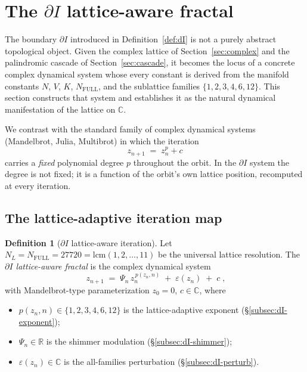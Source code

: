 \documentclass[11pt,a4paper]{article}
\theoremstyle{definition}
\newtheorem{definition}[theorem]{Definition}
\theoremstyle{remark}
\newcommand{\R}{\mathbb{R}}
\newcommand{\C}{\mathbb{C}}
\begin{document}
\section{The $\partial I$ lattice-aware fractal}\label{sec:fractal}

The boundary $\partial I$ introduced in Definition~\ref{def:dI} is not a purely abstract topological object. Given the complex lattice of Section~\ref{sec:complex} and the palindromic cascade of Section~\ref{sec:cascade}, it becomes the locus of a concrete complex dynamical system whose every constant is derived from the manifold constants $N$, $V$, $K$, $N_{\mathrm{FULL}}$, and the sublattice families $\{1,2,3,4,6,12\}$. This section constructs that system and establishes it as the natural dynamical manifestation of the lattice on $\C$.

We contrast with the standard family of complex dynamical systems (Mandelbrot, Julia, Multibrot) in which the iteration
\[
z_{n+1} \;=\; z_{n}^{p} + c
\]
carries a \emph{fixed} polynomial degree $p$ throughout the orbit. In the $\partial I$ system the degree is not fixed; it is a function of the orbit's own lattice position, recomputed at every iteration.

\subsection{The lattice-adaptive iteration map}

\begin{definition}[$\partial I$ lattice-aware iteration]\label{def:dI-iteration}
Let $N_{L}=N_{\mathrm{FULL}}=27720=\mathrm{lcm}(1,2,\ldots,11)$ be the universal lattice resolution. The \emph{$\partial I$ lattice-aware fractal} is the complex dynamical system
\[
\boxed{\;z_{n+1} \;=\; \Psi_{n}\, z_{n}^{\,p(z_{n},n)} \;+\; \varepsilon(z_{n}) \;+\; c\;,}
\]
with Mandelbrot-type parameterization $z_{0}=0$, $c\in\C$, where
\begin{itemize}[leftmargin=*]
\item $p(z_{n},n)\in\{1,2,3,4,6,12\}$ is the lattice-adaptive exponent (\S\ref{subsec:dI-exponent});
\item $\Psi_{n}\in\R$ is the shimmer modulation (\S\ref{subsec:dI-shimmer});
\item $\varepsilon(z_{n})\in\C$ is the all-families perturbation (\S\ref{subsec:dI-perturb}).
\end{itemize}
\end{definition}
\end{document}

